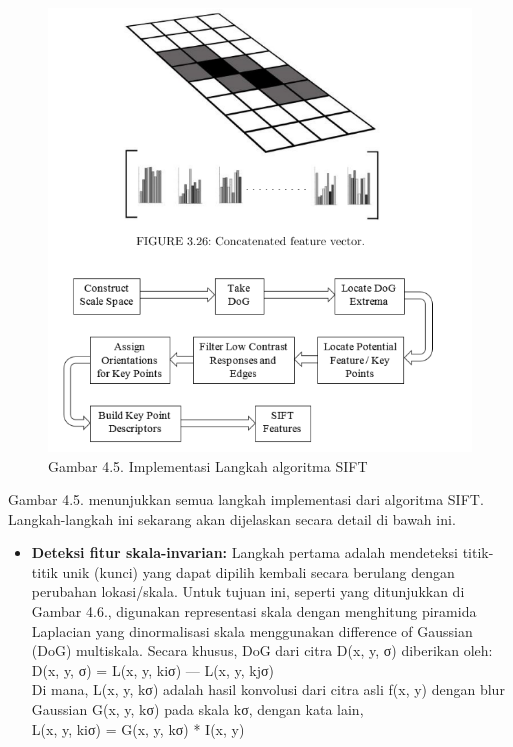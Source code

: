 \documentclass[
  letterpaper,
  DIV=11,
  numbers=noendperiod]{scrreprt}
\providecommand{\tightlist}{%
  \setlength{\itemsep}{0pt}\setlength{\parskip}{0pt}}\usepackage{longtable,booktabs,array}
\begin{document}
\begin{figure}

{\centering \includegraphics{Asset/image17.png}

}

\caption{Gambar 4.5. Implementasi Langkah algoritma SIFT}

\end{figure}

Gambar 4.5. menunjukkan semua langkah implementasi dari algoritma SIFT.
Langkah-langkah ini sekarang akan dijelaskan secara detail di bawah ini.

\begin{itemize}
\tightlist
\item
  \textbf{Deteksi fitur skala-invarian:} Langkah pertama adalah
  mendeteksi titik-titik unik (kunci) yang dapat dipilih kembali secara
  berulang dengan perubahan lokasi/skala. Untuk tujuan ini, seperti yang
  ditunjukkan di Gambar 4.6., digunakan representasi skala dengan
  menghitung piramida Laplacian yang dinormalisasi skala menggunakan
  difference of Gaussian (DoG) multiskala. Secara khusus, DoG dari citra
  D(x, y, σ) diberikan oleh:\\
  D(x, y, σ) = L(x, y, kiσ) --- L(x, y, kjσ)\\
  Di mana, L(x, y, kσ) adalah hasil konvolusi dari citra asli f(x, y)
  dengan blur Gaussian G(x, y, kσ) pada skala kσ, dengan kata lain,\\
  L(x, y, kiσ) = G(x, y, kσ) * I(x, y)
\end{itemize}
\end{document}
